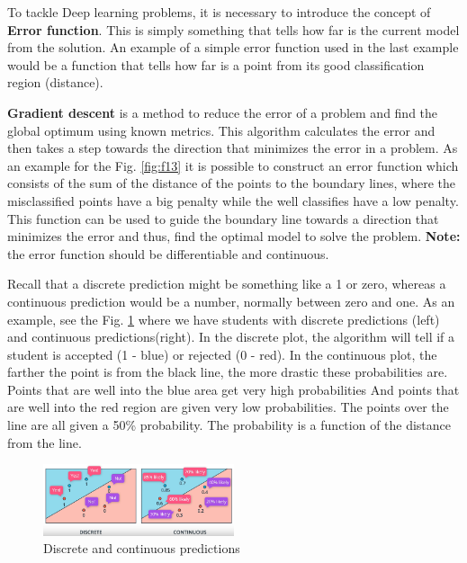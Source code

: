 \documentclass{article}
\begin{document}
To tackle Deep learning problems, it is necessary to introduce the concept of \textbf{Error function}. This is simply something that tells how far is the current model from the solution. An example of a simple error function used in the last example would be a function that tells how far is a point from its good classification region (distance).

\textbf{Gradient descent} is a method to reduce the error of a problem and find the global optimum using known metrics. This algorithm calculates the error and then takes a step towards the direction that minimizes the error in a problem. As an example for the Fig. \ref{fig:f13} it is possible to construct an error function which consists of the sum of the distance of the points to the boundary lines, where the misclassified points have a big penalty while the well classifies have a low penalty. This function can be used to guide the boundary line towards a direction that minimizes the error and thus, find the optimal model to solve the problem. \textbf{Note:} the error function should be differentiable and continuous. 

Recall that a discrete prediction might be something like a 1 or zero, whereas a continuous prediction would be a number, normally between zero and one. As an example, see the  Fig. \ref{fig:f18} where we have students with discrete predictions (left) and continuous predictions(right). In the discrete plot, the algorithm will tell if a student is accepted (1 - blue) or rejected (0 - red). In the continuous plot, the farther the point is from the black line, the more drastic these probabilities are. Points that are well into the blue area get very high probabilities And points that are well into the red region are given very low probabilities. The points over the line are all given a 50\% probability. The probability is a function of the distance from the line.

\begin{figure}[ht]
    \centering
    \includegraphics[width=0.5\textwidth,height=0.5\textheight,keepaspectratio]{images/discrete_continuous.png}
    \captionsetup{justification=centering}
    \caption{Discrete and continuous predictions}
    \label{fig:f18}
\end{figure}
\end{document}
